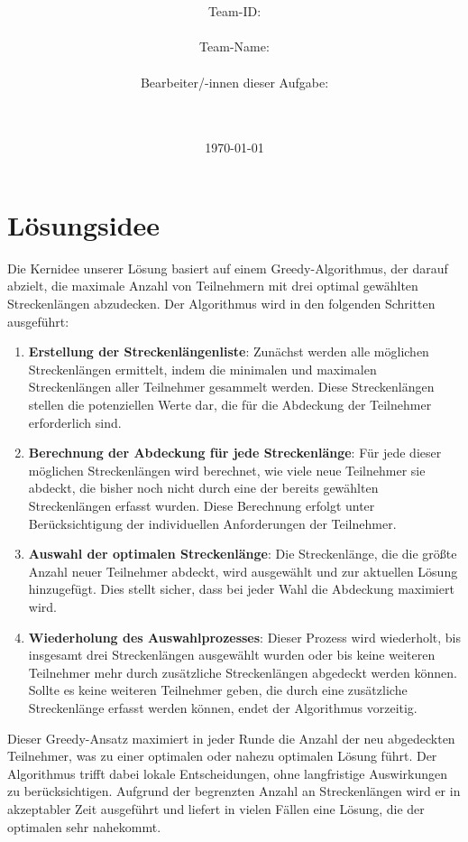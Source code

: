 \documentclass[a4paper,10pt,ngerman]{scrartcl}
\title{\textbf{\Huge\Aufgabe}}
\author{\LARGE Team-ID: \LARGE \TeamId \\\\
        \LARGE Team-Name: \LARGE \TeamName \\\\
        \LARGE Bearbeiter/-innen dieser Aufgabe: \\ 
        \LARGE \Namen\\\\}
\date{\LARGE\today}
\begin{document}
\maketitle
\tableofcontents

\vspace{0.5cm}

\section{Lösungsidee}

Die Kernidee unserer Lösung basiert auf einem Greedy-Algorithmus, der darauf abzielt, die maximale Anzahl von Teilnehmern mit drei optimal gewählten Streckenlängen abzudecken. Der Algorithmus wird in den folgenden Schritten ausgeführt:

\begin{enumerate}
    \item \textbf{Erstellung der Streckenlängenliste}: Zunächst werden alle möglichen Streckenlängen ermittelt, indem die minimalen und maximalen Streckenlängen aller Teilnehmer gesammelt werden. Diese Streckenlängen stellen die potenziellen Werte dar, die für die Abdeckung der Teilnehmer erforderlich sind.
    \item \textbf{Berechnung der Abdeckung für jede Streckenlänge}: Für jede dieser möglichen Streckenlängen wird berechnet, wie viele neue Teilnehmer sie abdeckt, die bisher noch nicht durch eine der bereits gewählten Streckenlängen erfasst wurden. Diese Berechnung erfolgt unter Berücksichtigung der individuellen Anforderungen der Teilnehmer.
    \item \textbf{Auswahl der optimalen Streckenlänge}: Die Streckenlänge, die die größte Anzahl neuer Teilnehmer abdeckt, wird ausgewählt und zur aktuellen Lösung hinzugefügt. Dies stellt sicher, dass bei jeder Wahl die Abdeckung maximiert wird.
    \item \textbf{Wiederholung des Auswahlprozesses}: Dieser Prozess wird wiederholt, bis insgesamt drei Streckenlängen ausgewählt wurden oder bis keine weiteren Teilnehmer mehr durch zusätzliche Streckenlängen abgedeckt werden können. Sollte es keine weiteren Teilnehmer geben, die durch eine zusätzliche Streckenlänge erfasst werden können, endet der Algorithmus vorzeitig.
\end{enumerate}

Dieser Greedy-Ansatz maximiert in jeder Runde die Anzahl der neu abgedeckten Teilnehmer, was zu einer optimalen oder nahezu optimalen Lösung führt. Der Algorithmus trifft dabei lokale Entscheidungen, ohne langfristige Auswirkungen zu berücksichtigen. Aufgrund der begrenzten Anzahl an Streckenlängen wird er in akzeptabler Zeit ausgeführt und liefert in vielen Fällen eine Lösung, die der optimalen sehr nahekommt.
\end{document}
